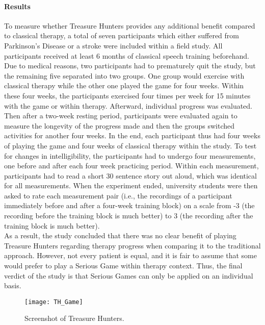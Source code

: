 \documentclass[draft,final]{vutinfth} %
\begin{document}
\paragraph{Results} To measure whether Treasure Hunters provides any additional benefit compared to classical therapy, a total of seven participants which either suffered from Parkinson's Disease or a stroke were included within a field study. All participants received at least 6 months of classical speech training beforehand. Due to medical reasons, two participants had to prematurely quit the study, but the remaining five separated into two groups. One group would exercise with classical therapy while the other one played the game for four weeks. Within these four weeks, the participants exercised four times per week for 15 minutes with the game or within therapy. Afterward, individual progress was evaluated. Then after a two-week resting period, participants were evaluated again to measure the longevity of the progress made and then the groups switched activities for another four weeks. In the end, each participant thus had four weeks of playing the game and four weeks of classical therapy within the study. To test for changes in intelligibility, the participants had to undergo four measurements, one before and after each four week practicing period. Within each measurement, participants had to read a short 30 sentence story out aloud, which was identical for all measurements. When the experiment ended, university students were then asked to rate each measurement pair (i.e., the recordings of a participant immediately before and after a  four-week training block) on a scale from -3 (the recording before the training block is much better) to 3 (the recording after the training block is much better). 
\\ As a result, the study concluded that there was no clear benefit of playing Treasure Hunters regarding therapy progress when comparing it to the traditional approach. However, not every patient is equal, and it is fair to assume that some would prefer to play a Serious Game within therapy context. Thus, the final verdict of the study is that Serious Games can only be applied on an individual basis.
\begin{figure}
\begin{center}
\texttt{[image: TH\_Game]}
\end{center}
\caption{Screenshot of Treasure Hunters\cite{TreasureHunters}.}
\end{figure}
\end{document}
